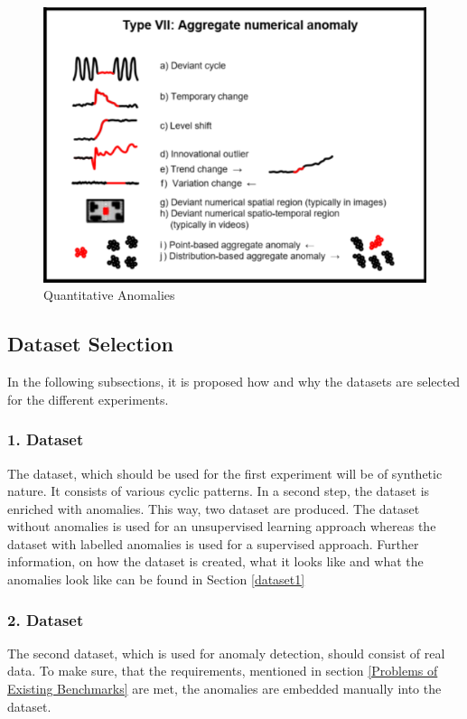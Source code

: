 \begin{figure}[h]
	\centering
	\includegraphics[scale=0.6]{Figures/series_anomaly}
	\decoRule
	\caption[Quantitative Anomalies]{Quantitative Anomalies \parencite{Foorthuis2021}}
	\label{fig:Anomaly_types}
\end{figure}

\subsection{Dataset Selection}
In the following subsections, it is proposed how and why the datasets are selected for the different experiments.

\subsubsection{1. Dataset}
The dataset, which should be used for the first experiment will be of synthetic nature. It consists of various cyclic patterns. In a second step, the dataset is enriched with anomalies. This way, two dataset are produced. The dataset without anomalies is used for an unsupervised learning approach whereas the dataset with labelled anomalies is used for a supervised approach. Further information, on how the dataset is created, what it looks like and what the anomalies look like can be found in Section \ref{dataset1} 

\subsubsection{2. Dataset}
The second dataset, which is used for anomaly detection, should consist of real data. To make sure, that the requirements, mentioned in section \ref{Problems of Existing Benchmarks} are met, the anomalies are embedded manually into the dataset. 

